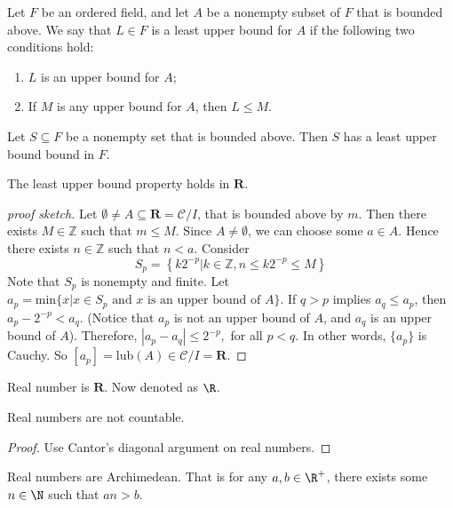 \documentclass[10pt]{article}
\begin{document}
\begin{definition}
    Let $F$ be an ordered field, and let $A$ be a nonempty subset of $F$ that is bounded above. We say that $L\in F$ is a least upper bound for $A$ if the following two conditions hold:
    \begin{enumerate}
        \item $L$ is an upper bound for $A$;
        \item If $M$ is any upper bound for $A$, then $L\leq M$.
    \end{enumerate}
\end{definition}
\begin{definition}
    Let $S\subseteq F$ be a nonempty set that is bounded above. Then $S$ has a least upper bound bound in $F$.  
\end{definition}
\begin{proposition}
    The least upper bound property holds in $\mathbf{R}$.
\end{proposition}
\begin{proof}[proof sketch]
    Let $\emptyset\neq A\subseteq\mathbf{R}=\mathcal{C}/{I}$, that is bounded above by $m$. Then there exists $ M\in\mathbb{Z}$ such that $m\leq M$. Since $A\neq\emptyset$, we can choose some $a\in A$. Hence there exists $ n\in\mathbb{Z}$ such that $n<a$. Consider 
    $$
        S_p=\left\{k2^{-p}\big|k\in\mathbb{Z},n\leq k2^{-p}\leq M\right\}
    $$
    Note that $S_p$ is nonempty and finite. Let $a_p=\text{min}\{x|x\in S_p \text{ and } x\text{ is an upper bound of } A\}$. If $q>p$ implies $a_q\leq a_p$, then $a_p-2^{-p}<a_q$. (Notice that $a_p$ is not an upper bound of $A$, and $a_q$ is an upper bound of $A$). Therefore, $|a_p-a_q|\leq 2^{-p}$,\ for all $p<q$. In other words, $\{a_p\}$ is Cauchy. So $[a_p]=$lub$(A)\in\mathcal{C}/{I}=\mathbf{R}$.
\end{proof}
\begin{definition}
    Real number is $\mathbf{R}$. Now denoted as $\R$.
\end{definition}
\begin{proposition}
    Real numbers are not countable.
\end{proposition}
\begin{proof}
    Use Cantor's diagonal argument on real numbers.
\end{proof}
\begin{proposition}
    Real numbers are Archimedean. That is for any $a,b\in\R^+$, there exists some $n\in\N$ such that $an>b$.
\end{proposition}
\end{document}
